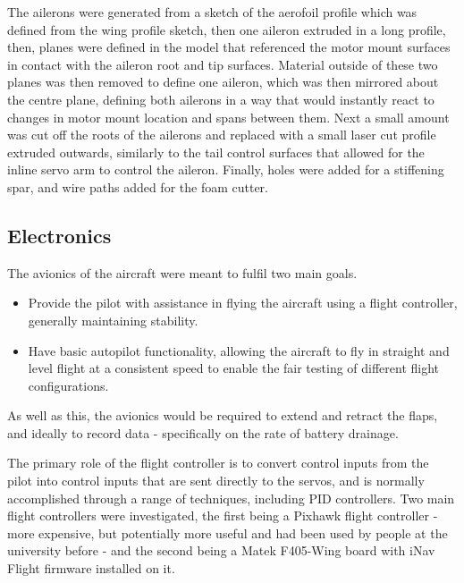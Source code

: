 \documentclass[../../main.tex]{subfiles}
\begin{document}
The ailerons were generated from a sketch of the aerofoil profile which was defined from the wing profile sketch, then one aileron extruded in a long profile, then, planes were defined in the model that referenced the motor mount surfaces in contact with the aileron root and tip surfaces.
Material outside of these two planes was then removed to define one aileron, which was then mirrored about the centre plane, defining both ailerons in a way that would instantly react to changes in motor mount location and spans between them.
Next a small amount was cut off the roots of the ailerons and replaced with a small laser cut profile extruded outwards, similarly to the tail control surfaces that allowed for the inline servo arm to control the aileron.
Finally, holes were added for a stiffening spar, and wire paths added for the foam cutter. 

\subsection{Electronics} \label{sec:design-process:final-design-proposal:electronics}


The avionics of the aircraft were meant to fulfil two main goals.

\begin{itemize}
    \item Provide the pilot with assistance in flying the aircraft using a flight controller, generally maintaining stability. 
    \item Have basic autopilot functionality, allowing the aircraft to fly in straight and level flight at a consistent speed to enable the fair testing of different flight configurations. 
\end{itemize}

As well as this, the avionics would be required to extend and retract the flaps, and ideally to record data - specifically on the rate of battery drainage. 

The primary role of the flight controller is to convert control inputs from the pilot into control inputs that are sent directly to the servos, and is normally accomplished through a range of techniques, including PID controllers.
Two main flight controllers were investigated, the first being a Pixhawk flight controller - more expensive, but potentially more useful and had been used by people at the university before - and the second being a Matek F405-Wing board with iNav Flight firmware installed on it. 
\end{document}
